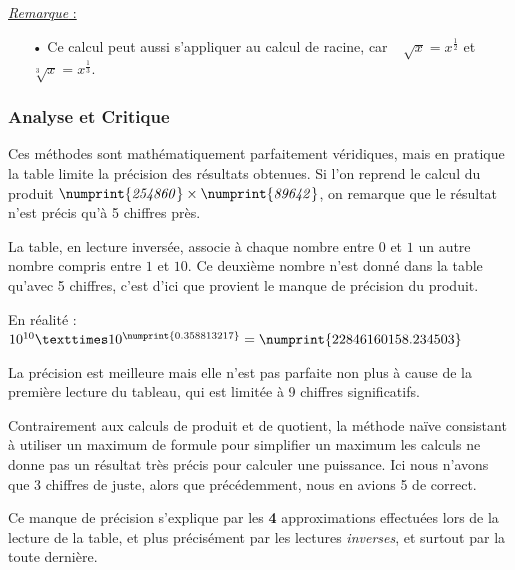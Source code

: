 \documentclass[a4paper]{article}
\begin{document}
{\begin{large}
\begin{tabular}{l|l}
\end{tabular}
\end{large}
}

\vspace{0.3 cm}

{\noindent\underline{\textit{Remarque} :}}

\begin{itemize}

	\item[•] Ce calcul peut aussi s'appliquer au calcul de racine, car ~{\Large $\sqrt[]{x} = x^{\frac{1}{2}}$} et {\Large $\sqrt[3]{x} = x^{\frac{1}{3}}$}.
	
\end{itemize}

\vfill

\subsubsection*{Analyse et Critique}

Ces méthodes sont mathématiquement parfaitement véridiques, mais en pratique la table limite la précision des résultats obtenues. Si l'on reprend le calcul du produit $\mathit{\numprint{254860} \times \numprint{89642}}$, on remarque que le résultat n'est précis qu'à 5 chiffres près.

La table, en lecture inversée, associe à chaque nombre entre $0$ et $1$ un autre nombre compris entre $1$ et $10$. Ce deuxième nombre n'est donné dans la table qu'avec 5 chiffres, c'est d'ici que provient le manque de précision du produit.

En réalité : $10 ^{ 10 } × 10^{\numprint{0.358813217}} = \numprint{22846160158.234503}$

La précision est meilleure mais elle n'est pas parfaite non plus à cause de la première lecture du tableau, qui est limitée à 9 chiffres significatifs.\\


\par Contrairement aux calculs de produit et de quotient, la méthode naïve consistant à utiliser un maximum de formule pour simplifier un maximum les calculs ne donne pas un résultat très précis pour calculer une puissance. Ici nous n'avons que 3 chiffres de juste, alors que précédemment, nous en avions 5 de correct.

Ce manque de précision s'explique par les \textbf{4} approximations effectuées lors de la lecture de la table, et plus précisément par les lectures \textit{inverses}, et surtout par la toute dernière.\\
\end{document}
